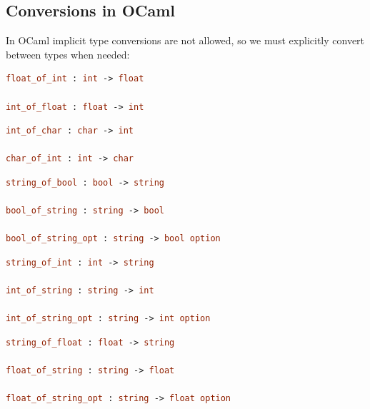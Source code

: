 \newpage 

\subsection{Conversions in OCaml}

In OCaml implicit type conversions are not allowed, so we must explicitly convert between types when needed:

\begin{Def}

\begin{lstlisting}[language=OCaml, caption={Integer and Float Conversions}, numbers=none]
float_of_int : int -> float

int_of_float : float -> int
\end{lstlisting}

\begin{lstlisting}[language=OCaml, caption={Character and Integer Conversions}, numbers=none]
int_of_char : char -> int

char_of_int : int -> char
\end{lstlisting}

\begin{lstlisting}[language=OCaml, caption={Boolean and String Conversions}, numbers=none]
string_of_bool : bool -> string

bool_of_string : string -> bool

bool_of_string_opt : string -> bool option
\end{lstlisting}

\begin{lstlisting}[language=OCaml, caption={String and Integer Conversions}, numbers=none]
string_of_int : int -> string

int_of_string : string -> int

int_of_string_opt : string -> int option
\end{lstlisting}

\begin{lstlisting}[language=OCaml, caption={String and Float Conversions}, numbers=none]
string_of_float : float -> string

float_of_string : string -> float

float_of_string_opt : string -> float option
\end{lstlisting}

\end{Def}

\newpage

